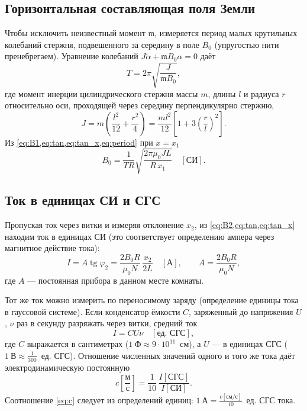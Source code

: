\documentclass[a4paper,12pt]{article}
\begin{document}
\subsection{Горизонтальная составляющая поля Земли}
Чтобы исключить неизвестный момент $\mathfrak{m}$, измеряется период малых
крутильных колебаний стержня, подвешенного за середину в поле $B_0$
(упругостью нити пренебрегаем). Уравнение колебаний
$J\ddot\alpha + \mathfrak{m}B_0\alpha = 0$ даёт
\begin{equation}
    \label{eq:period}
    T = 2\pi\sqrt{\frac{J}{\mathfrak{m}B_0}},
\end{equation}
где момент инерции цилиндрического стержня массы $m$, длины $l$ и радиуса
$r$ относительно оси, проходящей через середину перпендикулярно стержню,
\begin{equation}
    \label{eq:inertia}
    J = m\left(\frac{l^2}{12} + \frac{r^2}{4}\right)
      = \frac{ml^2}{12}\left[1 + 3\left(\frac{r}{l}\right)^2\right].
\end{equation}
Из \cref{eq:B1,eq:tan,eq:tan_x,eq:period} при $x = x_1$
\begin{equation}
    \label{eq:B0}
    B_0 = \frac{1}{TR}\sqrt{\frac{2\pi\mu_0 J L}{R\,x_1}}
    \quad[\text{СИ}].
\end{equation}

\subsection{Ток в единицах СИ и СГС}
Пропуская ток через витки и измеряя отклонение $x_2$, из
\cref{eq:B2,eq:tan,eq:tan_x} находим ток в единицах СИ (это соответствует
определению ампера через магнитное действие тока):
\begin{equation}
    \label{eq:I_SI}
    I = A\operatorname{tg}\varphi_2 = \frac{2B_0R}{\mu_0N}\,\frac{x_2}{2L}
    \quad[\text{А}],
    \qquad A = \frac{2B_0R}{\mu_0N},
\end{equation}
где $A$ --- постоянная прибора в данном месте комнаты.

Тот же ток можно измерить по переносимому заряду (определение единицы тока
в гауссовой системе). Если конденсатор ёмкости $C$, заряженный до
напряжения $U$, $\nu$ раз в секунду разряжать через витки, средний ток
\begin{equation}
    \label{eq:I_CGS}
    I = CU\nu \quad[\text{ед. СГС}],
\end{equation}
где $C$ выражается в сантиметрах ($1~\text{Ф} \approx 9\cdot10^{11}$~см), а
$U$ --- в единицах СГС ($1~\text{В} \approx \frac{1}{300}$~ед. СГС).
Отношение численных значений одного и того же тока даёт
электродинамическую постоянную
\begin{equation}
    \label{eq:c}
    c\left[\frac{\text{м}}{\text{с}}\right]
    = \frac{1}{10}\,\frac{I[\text{СГС}]}{I[\text{СИ}]}.
\end{equation}
Соотношение \cref{eq:c} следует из определений единиц: $1~\text{А} =
\frac{c[\text{см/с}]}{10}$~ед. СГС тока.
\end{document}
